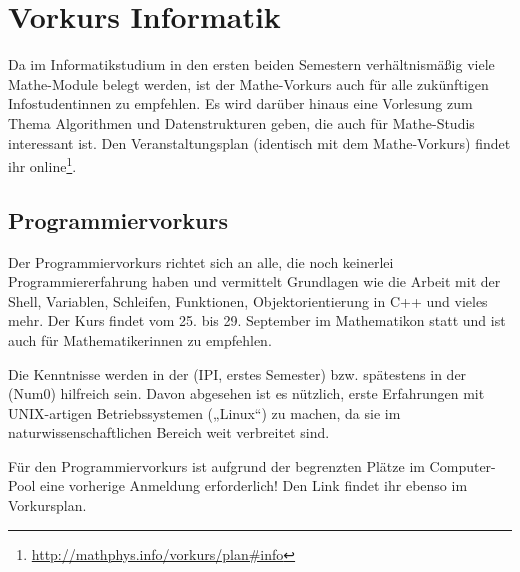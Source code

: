 \section{Vorkurs Informatik}
Da im Informatikstudium in den ersten beiden Semestern verhältnismäßig viele Mathe-Module belegt werden, ist der Mathe-Vorkurs auch für alle zukünftigen Infostudentinnen zu empfehlen. Es wird darüber hinaus eine Vorlesung zum Thema Algorithmen und Datenstrukturen geben, die auch für Mathe-Studis interessant ist. Den Veranstaltungsplan (identisch mit dem Mathe-Vorkurs) findet ihr online\footnote{\label{info-vorkursplan}\url{http://mathphys.info/vorkurs/plan\#info}}.

\subsection{Programmiervorkurs}
Der Programmiervorkurs richtet sich an alle, die noch keinerlei Programmiererfahrung haben und vermittelt Grundlagen wie die Arbeit mit der Shell, Variablen, Schleifen, Funktionen, Objektorientierung in C++ und vieles mehr. Der Kurs findet vom 25. bis 29. September im \gls{Mathematikon} statt und ist auch für Mathematikerinnen zu empfehlen.

Die Kenntnisse werden in der  (\gls{IPI}, erstes Semester) bzw. spätestens in der  (\gls{Num0}) hilfreich sein. Davon abgesehen ist es nützlich, erste Erfahrungen mit UNIX-artigen Betriebssystemen („Linux“) zu machen, da sie im naturwissenschaftlichen Bereich weit verbreitet sind.

Für den Programmiervorkurs ist aufgrund der begrenzten Plätze im Computer-Pool eine vorherige Anmeldung erforderlich! Den Link findet ihr ebenso im Vorkursplan.
